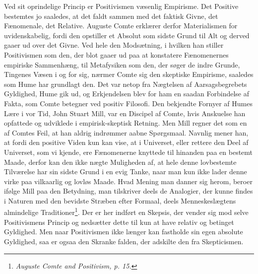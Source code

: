 \documentclass[12pt,a4paper,openany]{book}
\newcommand{\opage}[1]{\marginnote{\footnotesize\textit{[#1]}}}
\begin{document}
Ved sit oprindelige Princip er Positivismen væsenlig
Empirisme. Det Positive bestemtes jo saaledes, at det faldt
sammen med det faktisk Givne, det Fænomenale, det Relative.
Auguste Comte erklærer derfor Materialismen for
uvidenskabelig, fordi den opstiller et Absolut som sidste Grund
til Alt og derved gaaer ud over det Givne. Ved hele den
Modsætning, i hvilken han stiller Positivismen som den, der blot
\opage{205}gaaer ud paa at konstatere Fænomenernes empiriske Sammenhæng,
til Metafysiken som den, der søger de indre Grunde,
Tingenes Væsen i og for sig, nærmer Comte sig den skeptiske
Empirisme, saaledes som Hume har grundlagt den. Det
var netop fra Nægtelsen af Aarsagsbegrebets Gyldighed,
Hume gik ud, og Erkjendelsen blev for ham en saadan
Forbindelse af Fakta, som Comte betegner ved positiv Filosofi.
Den bekjendte Fornyer af Humes Lære i vor Tid, John
Stuart Mill, var en Discipel af Comte, hvis Anskuelse han
opfattede og udviklede i empirisk-skeptisk Retning. Men Mill
regner det som en af Comtes Feil, at han aldrig indrømmer
aabne Spørgsmaal. Navnlig mener han, at fordi den
positive Viden kun kan vise, at i Universet, eller rettere den
Deel af Universet, som vi kjende, ere Fænomenerne knyttede
til hinanden paa en bestemt Maade, derfor kan den ikke nægte
Muligheden af, at hele denne lovbestemte Tilværelse har sin
sidste Grund i en evig Tanke, naar man kun ikke lader
denne virke paa vilkaarlig og lovløs Maade. Hvad Mening
man danner sig herom, beroer ifølge Mill paa den Betydning,
man tilskriver deels de Analogier, der kunne findes i
Naturen med den bevidste Stræben efter Formaal, deels
Menneskeslægtens almindelige Traditioner\footnote{\textit{Auguste Comte and Positivism, p. 15.}}. Der er her
indført en Skepsis, der vender sig mod selve Positivismens
Princip og nedsætter dette til kun at have relativ og betinget
Gyldighed. Men naar Positivismen ikke længer kan fastholde
sin egen absolute Gyldighed, saa er ogsaa den Skranke
falden, der adskilte den fra Skepticismen.
\end{document}
